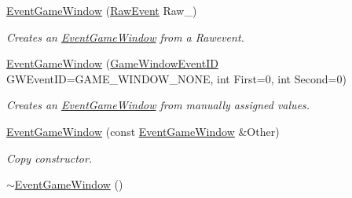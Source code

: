 \begin{DoxyCompactItemize}
\item 
\hyperlink{classphys_1_1EventGameWindow_aca917d4cf8ee17dd5253c294aac75bb8}{EventGameWindow} (\hyperlink{namespacephys_a8126d26e4507e66d09876988bb941fd4}{RawEvent} Raw\_\-)
\begin{DoxyCompactList}\small\item\em Creates an \hyperlink{classphys_1_1EventGameWindow}{EventGameWindow} from a Rawevent. \item\end{DoxyCompactList}\item 
\hyperlink{classphys_1_1EventGameWindow_aa9d3325376d97c6426c3f98e180352e9}{EventGameWindow} (\hyperlink{classphys_1_1EventGameWindow_a45225255070513d3cff88cdfea25cc09}{GameWindowEventID} GWEventID=GAME\_\-WINDOW\_\-NONE, int First=0, int Second=0)
\begin{DoxyCompactList}\small\item\em Creates an \hyperlink{classphys_1_1EventGameWindow}{EventGameWindow} from manually assigned values. \item\end{DoxyCompactList}\item 
\hyperlink{classphys_1_1EventGameWindow_a4011621e2c6fc55a9c89a489f90dc1c8}{EventGameWindow} (const \hyperlink{classphys_1_1EventGameWindow}{EventGameWindow} \&Other)
\begin{DoxyCompactList}\small\item\em Copy constructor. \item\end{DoxyCompactList}\item 
\hypertarget{classphys_1_1EventGameWindow_aa6e0b4f13327caaaab3e4656e6a9fa13}{
\hyperlink{classphys_1_1EventGameWindow_aa6e0b4f13327caaaab3e4656e6a9fa13}{$\sim$EventGameWindow} ()}
\label{classphys_1_1EventGameWindow_aa6e0b4f13327caaaab3e4656e6a9fa13}


\end{DoxyCompactItemize}
